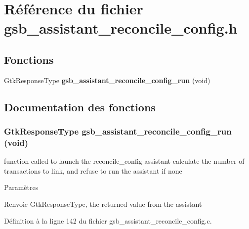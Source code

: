 \section{Référence du fichier gsb\_\-assistant\_\-reconcile\_\-config.h}
\label{gsb__assistant__reconcile__config_8h}
\subsection*{Fonctions}
\begin{DoxyCompactItemize}
\item 
GtkResponseType {\bf gsb\_\-assistant\_\-reconcile\_\-config\_\-run} (void)
\end{DoxyCompactItemize}


\subsection{Documentation des fonctions}
\subsubsection[{gsb\_\-assistant\_\-reconcile\_\-config\_\-run}]{\setlength{\rightskip}{0pt plus 5cm}GtkResponseType gsb\_\-assistant\_\-reconcile\_\-config\_\-run (void)}\label{gsb__assistant__reconcile__config_8h_ac16081c512d6e40d5904ec9c62b668d4}
function called to launch the reconcile\_\-config assistant calculate the number of transactions to link, and refuse to run the assistant if none


\begin{DoxyParams}{Paramètres}
\item[{\em }]\end{DoxyParams}
\begin{DoxyReturn}{Renvoie}
GtkResponseType, the returned value from the assistant 
\end{DoxyReturn}


Définition à la ligne 142 du fichier gsb\_\-assistant\_\-reconcile\_\-config.c.

